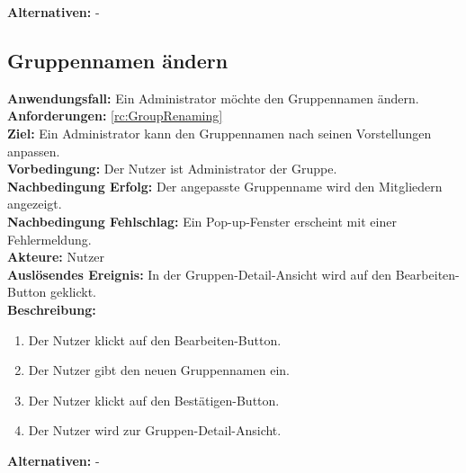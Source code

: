 \documentclass[parskip=full]{scrartcl}
\begin{document}
\textbf{Alternativen:} -
\newpage


\subsection{Gruppennamen ändern}
\textbf{Anwendungsfall:} Ein Administrator möchte den Gruppennamen ändern.\\
\textbf{Anforderungen:} \ref{rc:GroupRenaming}\\
\textbf{Ziel:} Ein Administrator kann den Gruppennamen nach seinen Vorstellungen anpassen.\\
\textbf{Vorbedingung:} Der Nutzer ist Administrator der Gruppe.\\
\textbf{Nachbedingung Erfolg:} Der angepasste Gruppenname wird den Mitgliedern angezeigt.\\
\textbf{Nachbedingung Fehlschlag:} Ein Pop-up-Fenster erscheint mit einer Fehlermeldung.\\
\textbf{Akteure:} Nutzer\\
\textbf{Auslösendes Ereignis:} In der Gruppen-Detail-Ansicht wird auf den Bearbeiten-Button geklickt.\\
\textbf{Beschreibung:}
\begin{enumerate}
    \item Der Nutzer klickt auf den Bearbeiten-Button.
    \item Der Nutzer gibt den neuen Gruppennamen ein.
    \item Der Nutzer klickt auf den Bestätigen-Button.
    \item Der Nutzer wird zur Gruppen-Detail-Ansicht.
\end{enumerate}
\textbf{Alternativen:} -
\end{document}
